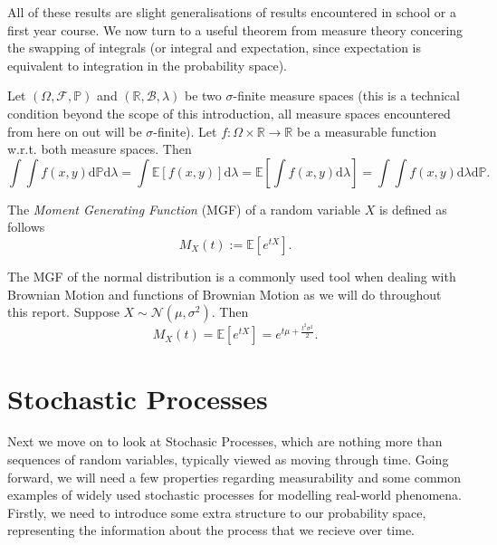 All of these results are slight generalisations of results encountered in school or 
a first year course. We now turn to a useful theorem from measure theory concering 
the swapping of integrals (or integral and expectation, since expectation is 
equivalent to integration in the probability space).

\begin{theorem}
    Let $(\Omega,\mathcal{F},\mathbb{P})$ and $(\mathbb{R},\mathcal{B},\lambda)$
    be two $\sigma$-finite measure spaces (this is a technical condition beyond the 
    scope of this introduction, all measure spaces encountered from here on out will
    be $\sigma$-finite). Let $f:\Omega\times\mathbb{R}\rightarrow\mathbb{R}$ be a 
    measurable function w.r.t. both measure spaces. Then
    \begin{equation}\label{eq:1.13}
        \int\int f(x,y)\mathrm d\mathbb{P}\mathrm d\lambda=\int\mathbb{E}[f(x,y)]\mathrm d\lambda=\mathbb{E}\left[\int f(x,y)\mathrm d\lambda\right]=\int \int f(x,y)\mathrm d\lambda\mathrm d\mathbb{P}.
    \end{equation}
\end{theorem}

\begin{definition}
    The \emph{Moment Generating Function} (MGF) of a random variable $X$ is defined as follows
    \begin{equation*}
        M_X(t):=\mathbb{E}[e^{tX}].
    \end{equation*}
\end{definition}

\begin{remark}
    The MGF of the normal distribution is a commonly used tool when dealing with
    Brownian Motion and functions of Brownian Motion as we will do throughout this
    report. Suppose $X\sim\mathcal{N}(\mu,\sigma^2)$. Then
    \begin{equation}
        M_X(t)=\mathbb{E}[e^{tX}]=e^{t\mu+\frac{t^2\sigma^2}{2}}.
    \end{equation}
\end{remark}

\section{Stochastic Processes}\label{sec:1.4}

Next we move on to look at Stochasic Processes, which are nothing more than sequences
of random variables, typically viewed as moving through time. Going forward, we will 
need a few properties regarding measurability and some common examples of widely used 
stochastic processes for modelling real-world phenomena. Firstly, we need to introduce 
some extra structure to our probability space, representing the information about the 
process that we recieve over time.

